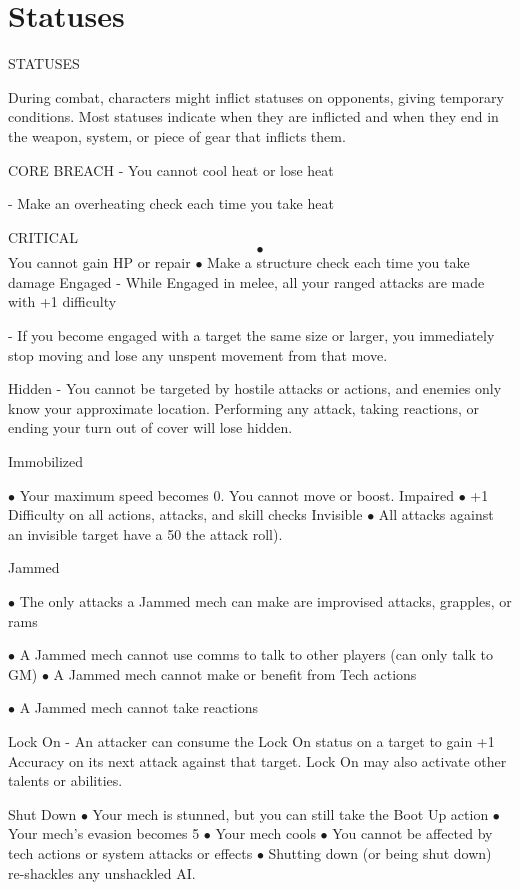 \section{Statuses}

  STATUSES

During combat, characters might inflict statuses on opponents, giving temporary conditions. Most
statuses indicate when they are inflicted and when they end in the weapon, system, or piece of
gear that inflicts them.

CORE BREACH
    -   You cannot cool heat or lose heat

    -   Make an overheating check each time you take heat

CRITICAL
    $$\bullet$$   You cannot gain HP or repair
    $\bullet$    Make a structure check each time you take damage
Engaged
    -   While Engaged in melee, all your ranged attacks are made with +1 difficulty

    -   If you become engaged with a target the same size or larger, you immediately stop
        moving and lose any unspent movement from that move.

Hidden
    -   You cannot be targeted by hostile attacks or actions, and enemies only know your
        approximate location. Performing any attack, taking reactions, or ending your turn out of
        cover will lose hidden.

Immobilized

    $\bullet$    Your maximum speed becomes 0. You cannot move or boost.
Impaired
    $\bullet$    +1 Difficulty on all actions, attacks, and skill checks
Invisible
    $\bullet$    All attacks against an invisible target have a 50%
        the attack roll).

Jammed

    $\bullet$    The only attacks a Jammed mech can make are improvised attacks, grapples, or rams

    $\bullet$    A Jammed mech cannot use comms to talk to other players (can only talk to GM)
    $\bullet$    A Jammed mech cannot make or benefit from Tech actions

    $\bullet$    A Jammed mech cannot take reactions

Lock On
    -   An attacker can consume the Lock On status on a target to gain +1 Accuracy on its next
        attack against that target. Lock On may also activate other talents or abilities.

Shut Down
    $\bullet$    Your mech is stunned, but you can still take the Boot Up action
    $\bullet$    Your mech’s evasion becomes 5
    $\bullet$    Your mech cools
    $\bullet$    You cannot be affected by tech actions or system attacks or effects
    $\bullet$    Shutting down (or being shut down) re-shackles any unshackled AI.

